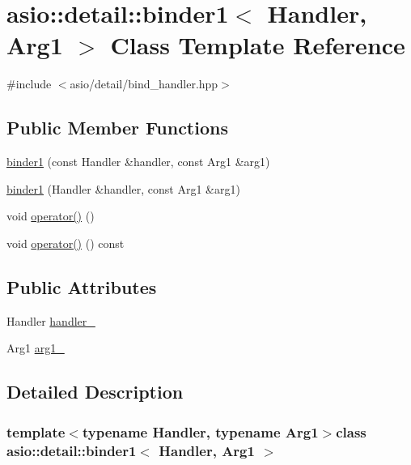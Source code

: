 \hypertarget{classasio_1_1detail_1_1binder1}{}\section{asio\+:\+:detail\+:\+:binder1$<$ Handler, Arg1 $>$ Class Template Reference}
\label{classasio_1_1detail_1_1binder1}


{\ttfamily \#include $<$asio/detail/bind\+\_\+handler.\+hpp$>$}

\subsection*{Public Member Functions}
\begin{DoxyCompactItemize}
\item 
\hyperlink{classasio_1_1detail_1_1binder1_ac8be09cb7da0bde108201256806825f7}{binder1} (const Handler \&handler, const Arg1 \&arg1)
\item 
\hyperlink{classasio_1_1detail_1_1binder1_ab9d5f61e5c61bac34455a76ff73d82b4}{binder1} (Handler \&handler, const Arg1 \&arg1)
\item 
void \hyperlink{classasio_1_1detail_1_1binder1_a908f2393b4fb0f12a88f19a03e965ae9}{operator()} ()
\item 
void \hyperlink{classasio_1_1detail_1_1binder1_adb046907b08e1d325cabbafb86e3eb1e}{operator()} () const 
\end{DoxyCompactItemize}
\subsection*{Public Attributes}
\begin{DoxyCompactItemize}
\item 
Handler \hyperlink{classasio_1_1detail_1_1binder1_a83f2550a63cac4baba9bdc47eef89b0d}{handler\+\_\+}
\item 
Arg1 \hyperlink{classasio_1_1detail_1_1binder1_a1097fe55b45d93ab5b1b2e209a153241}{arg1\+\_\+}
\end{DoxyCompactItemize}


\subsection{Detailed Description}
\subsubsection*{template$<$typename Handler, typename Arg1$>$class asio\+::detail\+::binder1$<$ Handler, Arg1 $>$}



